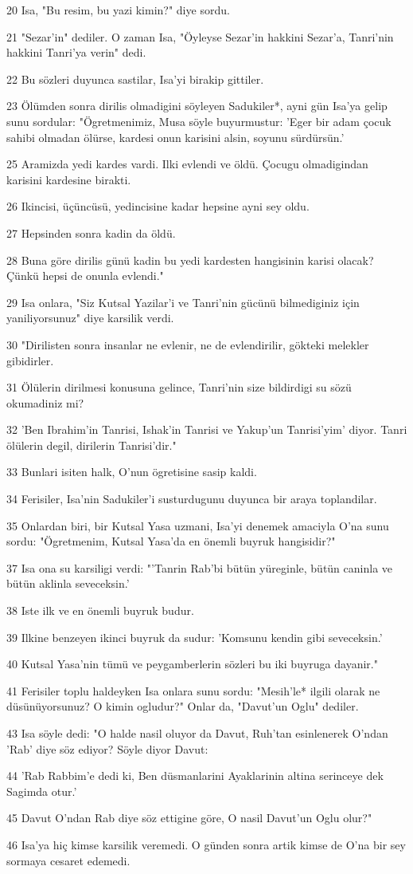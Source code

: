 \par 20 Isa, "Bu resim, bu yazi kimin?" diye sordu.
\par 21 "Sezar'in" dediler. O zaman Isa, "Öyleyse Sezar'in hakkini Sezar'a, Tanri'nin hakkini Tanri'ya verin" dedi.
\par 22 Bu sözleri duyunca sastilar, Isa'yi birakip gittiler.
\par 23 Ölümden sonra dirilis olmadigini söyleyen Sadukiler*, ayni gün Isa'ya gelip sunu sordular: "Ögretmenimiz, Musa söyle buyurmustur: 'Eger bir adam çocuk sahibi olmadan ölürse, kardesi onun karisini alsin, soyunu sürdürsün.'
\par 25 Aramizda yedi kardes vardi. Ilki evlendi ve öldü. Çocugu olmadigindan karisini kardesine birakti.
\par 26 Ikincisi, üçüncüsü, yedincisine kadar hepsine ayni sey oldu.
\par 27 Hepsinden sonra kadin da öldü.
\par 28 Buna göre dirilis günü kadin bu yedi kardesten hangisinin karisi olacak? Çünkü hepsi de onunla evlendi."
\par 29 Isa onlara, "Siz Kutsal Yazilar'i ve Tanri'nin gücünü bilmediginiz için yaniliyorsunuz" diye karsilik verdi.
\par 30 "Dirilisten sonra insanlar ne evlenir, ne de evlendirilir, gökteki melekler gibidirler.
\par 31 Ölülerin dirilmesi konusuna gelince, Tanri'nin size bildirdigi su sözü okumadiniz mi?
\par 32 'Ben Ibrahim'in Tanrisi, Ishak'in Tanrisi ve Yakup'un Tanrisi'yim' diyor. Tanri ölülerin degil, dirilerin Tanrisi'dir."
\par 33 Bunlari isiten halk, O'nun ögretisine sasip kaldi.
\par 34 Ferisiler, Isa'nin Sadukiler'i susturdugunu duyunca bir araya toplandilar.
\par 35 Onlardan biri, bir Kutsal Yasa uzmani, Isa'yi denemek amaciyla O'na sunu sordu: "Ögretmenim, Kutsal Yasa'da en önemli buyruk hangisidir?"
\par 37 Isa ona su karsiligi verdi: "'Tanrin Rab'bi bütün yüreginle, bütün caninla ve bütün aklinla seveceksin.'
\par 38 Iste ilk ve en önemli buyruk budur.
\par 39 Ilkine benzeyen ikinci buyruk da sudur: 'Komsunu kendin gibi seveceksin.'
\par 40 Kutsal Yasa'nin tümü ve peygamberlerin sözleri bu iki buyruga dayanir."
\par 41 Ferisiler toplu haldeyken Isa onlara sunu sordu: "Mesih'le* ilgili olarak ne düsünüyorsunuz? O kimin ogludur?" Onlar da, "Davut'un Oglu" dediler.
\par 43 Isa söyle dedi: "O halde nasil oluyor da Davut, Ruh'tan esinlenerek O'ndan 'Rab' diye söz ediyor? Söyle diyor Davut:
\par 44 'Rab Rabbim'e dedi ki, Ben düsmanlarini Ayaklarinin altina serinceye dek Sagimda otur.'
\par 45 Davut O'ndan Rab diye söz ettigine göre, O nasil Davut'un Oglu olur?"
\par 46 Isa'ya hiç kimse karsilik veremedi. O günden sonra artik kimse de O'na bir sey sormaya cesaret edemedi.

